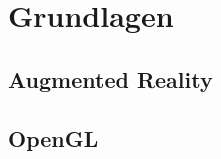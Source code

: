 \chapter{Grundlagen}\label{sec:Grundlagen}


\section{Augmented Reality}\label{AR}
\section{OpenGL}\label{OpenGL}
